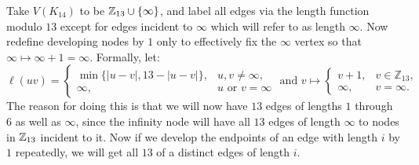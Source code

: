 Take $V(K_{14})$ to be $\mathbb{Z}_{13}\cup \{\infty\}$, and label all edges via the length function modulo $13$ except for edges incident to $\infty$ which will refer to as length $\infty$. Now redefine developing nodes by $1$ only to effectively fix the $\infty$ vertex so that $\infty\mapsto \infty+1=\infty$. Formally, let:
$$\ell(uv)=\begin{cases}\min\{|u-v|,13-|u-v|\}, & u,v\neq \infty, \\ \infty, & u\text{ or }v=\infty \end{cases} \text{ and }v\mapsto 
\begin{cases}
  v+1,&v\in\mathbb{Z}_{13},\\
  \infty,        &v=\infty.
  \end{cases}$$
The reason for doing this is that we will now have $13$ edges of lengths $1$ through $6$ as well as $\infty$, since the infinity node will have all $13$ edges of length $\infty$ to nodes in $\mathbb{Z}_{13}$ incident to it. Now if we develop the endpoints of an edge with length $i$ by $1$ repeatedly, we will get all $13$ of a distinct edges of length $i$.

